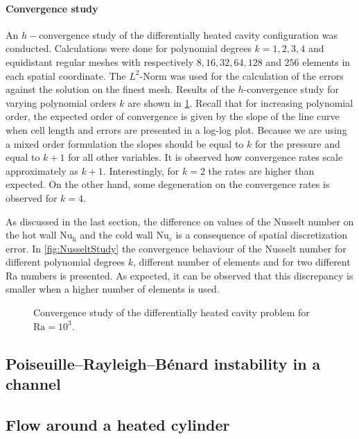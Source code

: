 \paragraph{Convergence study}\label{ssec:ConvStudyHeatedCavity}
An $h-$convergence study of the differentially heated cavity configuration was conducted. Calculations were done for polynomial degrees $k = {1,2,3,4}$ and equidistant regular meshes with respectively $8, 16, 32, 64, 128$ and $256$ elements in each spatial coordinate.  The $L^2$-Norm was used for the calculation of the errors against the solution on the finest mesh. Results of the $h$-convergence study for varying polynomial orders $k$ are shown in \cref{fig:ConvergenceDHC}. Recall that for increasing polynomial order, the expected order of convergence is given by the slope of the line curve when cell length and errors are presented in a log-log plot. Because we are using a mixed order formulation the slopes should be equal to $k$ for the pressure and equal to $k+1$ for all other variables.  It is observed how convergence rates scale approximately as $k+1$. Interestingly, for $k=2$ the rates are higher than expected. On the other hand, some degeneration on the convergence rates is observed for $k = 4$.

As discussed in the last section, the difference on values of the Nusselt number on the hot wall $\text{Nu}_\text{h}$ and the cold wall $\text{Nu}_c$ is a consequence of spatial discretization error. In \cref{fig:NusseltStudy} the convergence behaviour of the Nusselt number for different polynomial degrees $k$, different number of elements and for two different Ra numbers is presented. As expected, it can be observed that this discrepancy is smaller when a higher number of elements is used.


\begin{figure}[t!]
	\centering
	\pgfplotsset{width=0.34\textwidth, compat=1.3}
	\caption{Convergence study of the differentially heated cavity problem for $\text{Ra} = 10^3$.}\label{fig:ConvergenceDHC}
\end{figure}




\subsection{Poiseuille–Rayleigh–Bénard instability in a channel}
\blindtext[5]


\subsection{Flow around a heated cylinder}
